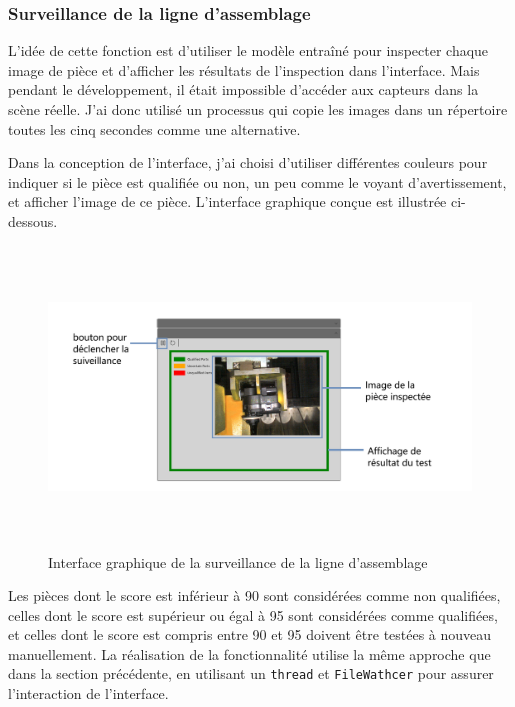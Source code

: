 \subsubsection{Surveillance de la ligne d'assemblage}
L'idée de cette fonction est d'utiliser le modèle entraîné pour inspecter chaque image de pièce et d'afficher les résultats de l'inspection dans l'interface. Mais pendant le développement, il était impossible d'accéder aux capteurs dans la scène réelle. J'ai donc utilisé un processus qui copie les images dans un répertoire toutes les cinq secondes comme une alternative. 

Dans la conception de l'interface, j'ai choisi d'utiliser différentes couleurs pour indiquer si le pièce est qualifiée ou non, un peu comme le voyant d'avertissement, et afficher l'image de ce pièce. L'interface graphique conçue est illustrée ci-dessous.
\begin{figure}[H]
    \centering
    \includegraphics[height=8cm]{ressources/images/monitoring.png}
    \caption{Interface graphique de la surveillance de la ligne d'assemblage}
\end{figure}

 Les pièces dont le score est inférieur à 90 sont considérées comme non qualifiées, celles dont le score est supérieur ou égal à 95 sont considérées comme qualifiées, et celles dont le score est compris entre 90 et 95 doivent être testées à nouveau manuellement. La réalisation de la fonctionnalité utilise la même approche que dans la section précédente, en utilisant  un \texttt{thread} et \texttt{FileWathcer} pour assurer l'interaction de l'interface.

